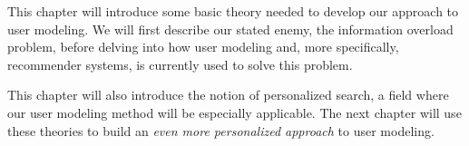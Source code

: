 This chapter will introduce some basic theory needed to develop our approach to user modeling.
We will first describe our stated enemy, the information overload problem, before delving into
how user modeling and, more specifically, recommender systems, is currently used to solve this problem.

This chapter will also introduce the notion of personalized search, a field where
our user modeling method will be especially applicable.
The next chapter will use these theories to build an \emph{even more personalized approach} to user modeling.


